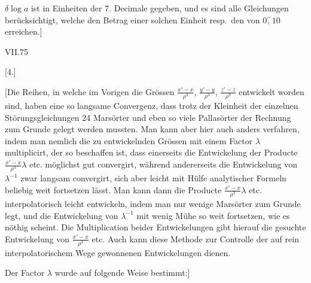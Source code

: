 \par\noindent\hspace*{\parindent}\(\delta\log a\) ist in Einheiten der 7. Decimale gegeben, und es sind alle Gleichungen berücksichtigt, welche
den Betrag einer solchen Einheit resp.\ den von \(0\overset{\prime\prime}{,}10\) erreichen.]
\par\smallskip\noindent VII.\hfill 75\par
\par\endgroup

\par\medskip
{}
\begin{center}[4.]\end{center}
\begingroup
\small
\par\noindent\hspace*{\parindent}[Die Reihen, in welche im Vorigen die Grössen \(\frac{x'-x}{\rho^3}\), \(\frac{y'-y}{\rho^3}\), \(\frac{z'-z}{\rho^3}\) entwickelt worden sind,
haben eine so langsame Convergenz, dass trotz der Kleinheit der einzelnen Störungsgleichungen 24 Marsörter
und eben so viele Pallasörter der Rechnung zum Grunde gelegt werden mussten. Man kann aber hier
auch anders verfahren, indem man nemlich die zu entwickelnden Grössen mit einem Factor \(\lambda\) multiplicirt,
der so beschaffen ist, dass einerseits die Entwickelung der Producte \(\frac{x'-x}{\rho^3}\lambda\) etc. möglichst gut convergirt,
während andererseits die Entwickelung von \(\lambda^{-1}\) zwar langsam convergirt, sich aber leicht mit Hülfe analytischer
Formeln beliebig weit fortsetzen lässt. Man kann dann die Producte \(\frac{x'-x}{\rho^3}\lambda\) etc. interpolatorisch
leicht entwickeln, indem man nur wenige Marsörter zum Grunde legt, und die Entwickelung von \(\lambda^{-1}\) mit
wenig Mühe so weit fortsetzen, wie es nöthig scheint. Die Multiplication beider Entwickelungen gibt hierauf
die gesuchte Entwickelung von \(\frac{x'-x}{\rho^3}\) etc. Auch kann diese Methode zur Controlle der auf rein interpolatorischem
Wege gewonnenen Entwickelungen dienen.
\par\noindent\hspace*{\parindent}Der Factor \(\lambda\) wurde auf folgende Weise bestimmt:]
\par\endgroup
\clearpage
\endgroup

